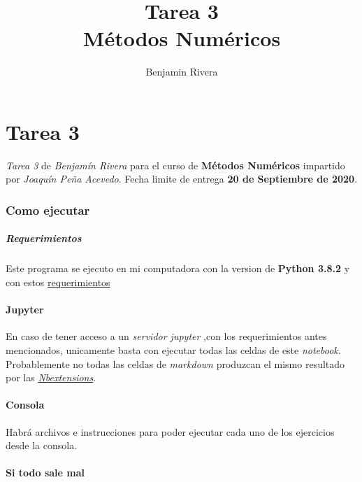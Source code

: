 \documentclass[11pt]{article}
\title{Tarea 3\\M\'etodos Num\'ericos}
\author{Benjamin Rivera}
\begin{document}
    
    \maketitle
    \tableofcontents

 
    

    \newpage
    \hypertarget{tarea-3}{%
\section{Tarea 3}\label{tarea-3}}

\emph{Tarea 3} de \emph{Benjamín Rivera} para el curso de
\textbf{Métodos Numéricos} impartido por \emph{Joaquín Peña Acevedo}.
Fecha limite de entrega \textbf{20 de Septiembre de 2020}.

    \hypertarget{como-ejecutar}{%
\subsubsection{Como ejecutar}\label{como-ejecutar}}

    \hypertarget{requerimientos}{%
\subparagraph{Requerimientos}\label{requerimientos}}

Este programa se ejecuto en mi computadora con la version de
\textbf{Python 3.8.2} y con estos
\href{https://github.com/BenchHPZ/UG-Compu/blob/master/MN/requerimientos.txt}{requerimientos}

\hypertarget{jupyter}{%
\paragraph{Jupyter}\label{jupyter}}

En caso de tener acceso a un \emph{servidor jupyter} ,con los
requerimientos antes mencionados, unicamente basta con ejecutar todas
las celdas de este \emph{notebook}. Probablemente no todas las celdas de
\emph{markdown} produzcan el mismo resultado por las
\href{jupyter-contrib-nbextensions.readthedocs.io}{\emph{Nbextensions}}.

\hypertarget{consola}{%
\paragraph{Consola}\label{consola}}

Habrá archivos e instrucciones para poder ejecutar cada uno de los
ejercicios desde la consola.

\hypertarget{si-todo-sale-mal}{%
\paragraph{Si todo sale mal}\label{si-todo-sale-mal}}
\end{document}
